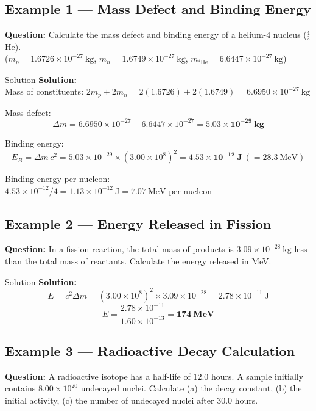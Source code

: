 \subsection*{Example 1 — Mass Defect and Binding Energy}

\textbf{Question:} Calculate the mass defect and binding energy of a helium-4 nucleus ($^4_2$He). \\
($m_p = 1.6726\times10^{-27}\ \text{kg}$, $m_n = 1.6749\times10^{-27}\ \text{kg}$, $m_{^4\text{He}} = 6.6447\times10^{-27}\ \text{kg}$)

\begin{examplebox}{Solution}
\textbf{Solution:}\\
Mass of constituents: $2m_p + 2m_n = 2(1.6726) + 2(1.6749) = 6.6950\times10^{-27}\ \text{kg}$

Mass defect:
$$\Delta m = 6.6950\times10^{-27} - 6.6447\times10^{-27} = \mathbf{5.03\times10^{-29}\ \text{kg}}$$

Binding energy:
$$E_B = \Delta m\,c^2 = 5.03\times10^{-29} \times (3.00\times10^8)^2 = \mathbf{4.53\times10^{-12}\ \text{J}}\ (= 28.3\ \text{MeV})$$

Binding energy per nucleon: $4.53\times10^{-12}/4 = 1.13\times10^{-12}\ \text{J} = 7.07\ \text{MeV per nucleon}$
\end{examplebox}

\subsection*{Example 2 — Energy Released in Fission}

\textbf{Question:} In a fission reaction, the total mass of products is $3.09\times10^{-28}\ \text{kg}$ less than the total mass of reactants. Calculate the energy released in MeV.

\begin{examplebox}{Solution}
\textbf{Solution:}\\
$$E = c^2\Delta m = (3.00\times10^8)^2 \times 3.09\times10^{-28} = 2.78\times10^{-11}\ \text{J}$$
$$E = \frac{2.78\times10^{-11}}{1.60\times10^{-13}} = \mathbf{174\ \text{MeV}}$$
\end{examplebox}

\subsection*{Example 3 — Radioactive Decay Calculation}

\textbf{Question:} A radioactive isotope has a half-life of $12.0$ hours. A sample initially contains $8.00\times10^{20}$ undecayed nuclei. Calculate (a) the decay constant, (b) the initial activity, (c) the number of undecayed nuclei after 30.0 hours.

